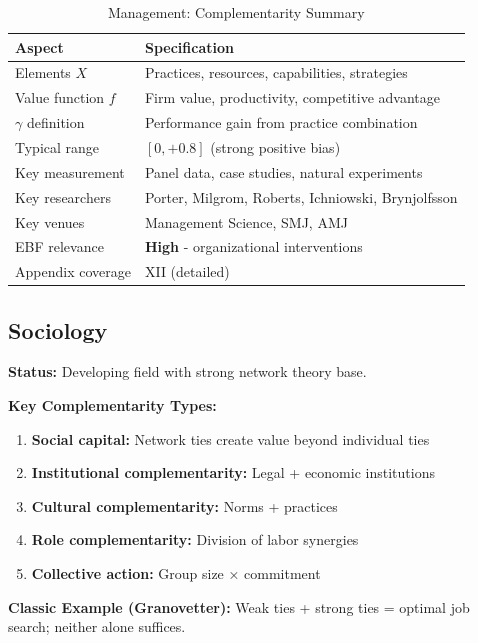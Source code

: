 \begin{table}[h]
\centering
\caption{Management: Complementarity Summary}
\label{tab:mgmt-summary}
\renewcommand{\arraystretch}{1.3}
\small
\begin{tabular}{@{}ll@{}}
\toprule
\textbf{Aspect} & \textbf{Specification} \\
\midrule
Elements $X$ & Practices, resources, capabilities, strategies \\
Value function $f$ & Firm value, productivity, competitive advantage \\
$\gamma$ definition & Performance gain from practice combination \\
Typical range & $[0, +0.8]$ (strong positive bias) \\
Key measurement & Panel data, case studies, natural experiments \\
Key researchers & Porter, Milgrom, Roberts, Ichniowski, Brynjolfsson \\
Key venues & Management Science, SMJ, AMJ \\
EBF relevance & \textbf{High} - organizational interventions \\
Appendix coverage & XII (detailed) \\
\bottomrule
\end{tabular}
\end{table}

\subsection{Sociology}
\label{sec:socio}

\begin{tcolorbox}[colback=gray!5!white,colframe=gray!75!black,title=\textbf{Sociology: Social Network Complementarities}]

\textbf{Status:} Developing field with strong network theory base.

\textbf{Key Complementarity Types:}
\begin{enumerate}[noitemsep]
    \item \textbf{Social capital:} Network ties create value beyond individual ties
    \item \textbf{Institutional complementarity:} Legal + economic institutions
    \item \textbf{Cultural complementarity:} Norms + practices
    \item \textbf{Role complementarity:} Division of labor synergies
    \item \textbf{Collective action:} Group size × commitment
\end{enumerate}

\textbf{Classic Example (Granovetter):}
Weak ties + strong ties = optimal job search; neither alone suffices.

\end{tcolorbox}

